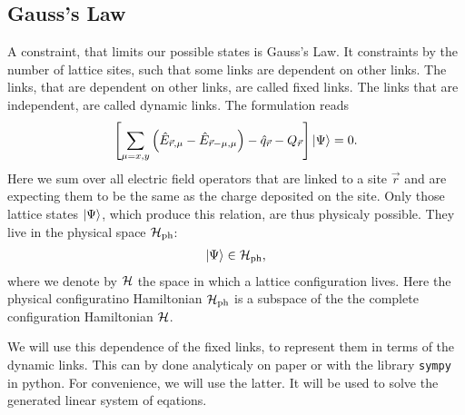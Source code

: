 \subsection{Gauss's Law}
A constraint, that limits our possible states is Gauss's Law. It constraints by the number of lattice sites, such that some links are dependent on other links. The links, that are dependent on other links, are called fixed links. The links that are independent, are called dynamic links. The formulation reads
\begin{align}
  \left[\sum_{\mu=x,y}\left(\hat{E}_{\vec{r},\mu}-\hat{E}_{\vec{r}-\mu,\mu}\right)-\hat{q}_{\vec{r}}-Q_{\vec{r}}\right]\ket{\Psi}=0.
\end{align}
Here we sum over all electric field operators that are linked to a site $\vec{r}$ and are expecting them to be the same as the charge deposited on the site. Only those lattice states $\ket{\Psi}$, which produce this relation, are thus physicaly possible. They live in the physical space $\cal{H}_{\text{ph}}$:
\begin{align}
	\ket{\Psi}\in\cal{H}_{\text{ph}},
\end{align}
where we denote by $\cal{H}$ the space in which a lattice configuration lives. Here the physical configuratino Hamiltonian $\cal{H}_{\text{ph}}$ is a subspace of the the complete configuration Hamiltonian $\cal{H}$.

We will use this dependence of the fixed links, to represent them in terms of the dynamic links. This can by done analyticaly on paper or with the library \texttt{sympy}\cite{10.7717/peerj-cs.103} in python. For convenience, we will use the latter. It will be used to solve the generated linear system of eqations.




